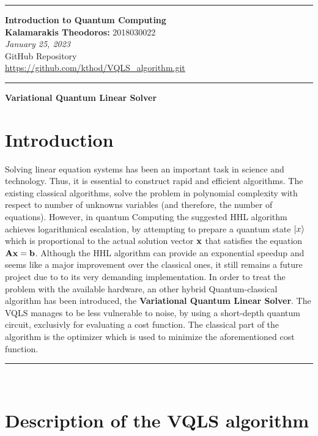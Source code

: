 \documentclass[12pt]{article}
\begin{document}
\noindent\rule{\textwidth}{2pt}
\begin{center}
\large
{\bf Introduction to Quantum Computing}\\ 
\normalsize
{\bf Kalamarakis Theodoros:} 2018030022\\
{\it January 25, 2023}\\
{GitHub Repository}\\
{\underline{\url{https://github.com/kthod/VQLS_algorithm.git}}}
\end{center}
\rule{\textwidth}{.5pt}
\noindent


\justifying

   \begin{center}
       \vspace*{0.5cm}
           
       \LARGE
       \textbf{Variational Quantum Linear Solver}
         
   \end{center}

\section*{{\bf Introduction}}
Solving linear equation systems has been an important task in science and technology. Thus, it is essential 
to construct rapid and efficient algorithms. The existing classical algorithms, solve the problem in polynomial
complexity with respect to number of unknowns variables (and therefore, the number of equations). However, in 
quantum Computing the suggested HHL algorithm achieves logarithmical escalation, by attempting to prepare a quantum state
$\left\vert{x}\right\rangle$ which is proportional to the actual solution vector $\bf x$ that satisfies the equation $\bf Ax=b$.
Although the HHL algorithm can provide an exponential speedup and  seems like a major improvement over the classical ones, it still remains a future project due to 
to its very demanding implementation. In order to treat the problem with the available hardware, an other hybrid Quantum-classical 
algorithm has been introduced, the {\bf Variational Quantum Linear Solver}. The VQLS manages to be less vulnerable to noise, by using a short-depth quantum circuit,
exclusivly for evaluating a cost function. The classical part of the algorithm is the optimizer which is used to minimize the aforementioned cost function.
{\raggedleft
\rule{\textwidth}{.5pt}}\\
\section*{{\bf Description of the VQLS algorithm}}
\end{document}
